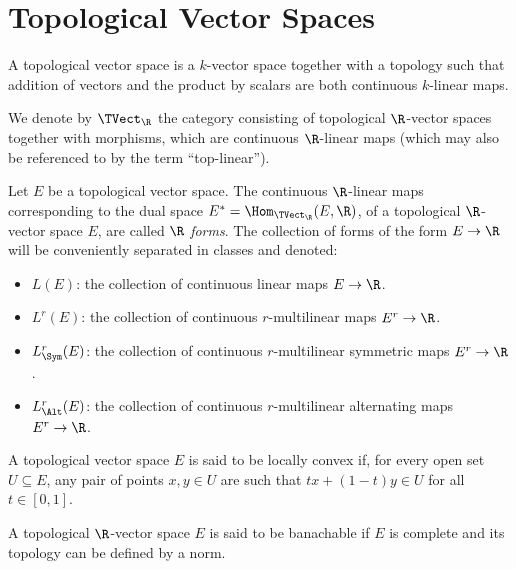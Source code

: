 \section{Topological Vector Spaces}

\begin{definition}
\label{def:topological-vector-space}
A topological vector space is a \(k\)-vector space together with a topology
such that addition of vectors and the product by scalars are both continuous
\(k\)-linear maps.

We denote by \(\TVect_{\R}\) the category consisting of topological
\(\R\)-vector spaces together with morphisms, which are continuous \(\R\)-linear
maps (which may also be referenced to by the term ``top-linear'').

Let \(E\) be a topological vector space. The continuous \(\R\)-linear maps
corresponding to the dual space \(E^{*} = \Hom_{\TVect_{\R}}(E, \R)\), of a
topological \(\R\)-vector space \(E\), are called \(\R\) \emph{forms}. The
collection of forms of the form \(E \to \R\) will be conveniently separated in
classes and denoted:
\begin{itemize}\setlength\itemsep{0em}
\item \(L(E)\): the collection of continuous linear maps \(E \to \R\).
\item \(L^r(E)\): the collection of continuous \(r\)-multilinear maps \(E^r \to \R\).
\item \(L^r_{\Sym}(E)\): the collection of continuous \(r\)-multilinear
  symmetric maps \(E^r \to \R\).
\item \(L^r_{\Alt}(E)\): the collection of continuous \(r\)-multilinear
  alternating maps \(E^r \to \R\).
\end{itemize}
\end{definition}

\begin{definition}
\label{def:locally-convex}
A topological vector space \(E\) is said to be locally convex if, for every open
set \(U \subseteq E\), any pair of points \(x, y \in U\) are such that \(t x +
(1 - t) y \in U\) for all \(t \in [0, 1]\).
\end{definition}

\begin{definition}[Banachable]
\label{def:banachable}
A topological \(\R\)-vector space \(E\) is said to be banachable if \(E\) is
complete and its topology can be defined by a norm.
\end{definition}

